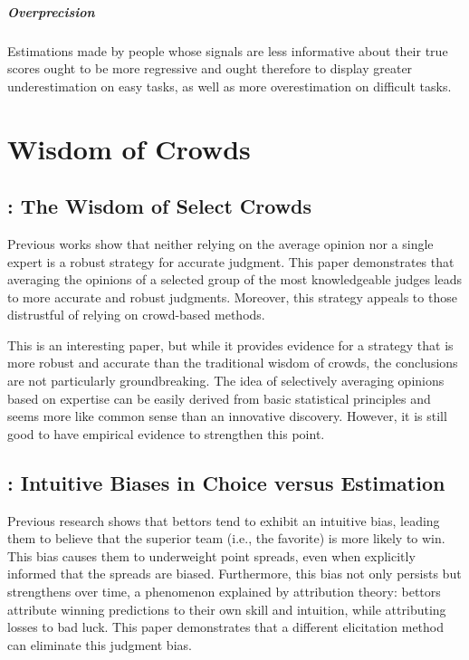 \documentclass[11pt]{elegantbook}
\begin{document}
\paragraph*{Overprecision}
Estimations made by people whose signals are less informative about their true scores ought to be more regressive and ought therefore to display greater underestimation on easy tasks, as well as more overestimation on difficult tasks.



\chapter{Wisdom of Crowds}
\section{\cite{mannes2014wisdom}: The Wisdom of Select Crowds}
Previous works show that neither relying on the average opinion nor a single expert is a robust strategy for accurate judgment. This paper demonstrates that averaging the opinions of a selected group of the most knowledgeable judges leads to more accurate and robust judgments. Moreover, this strategy appeals to those distrustful of relying on crowd-based methods.

This is an interesting paper, but while it provides evidence for a strategy that is more robust and accurate than the traditional wisdom of crowds, the conclusions are not particularly groundbreaking. The idea of selectively averaging opinions based on expertise can be easily derived from basic statistical principles and seems more like common sense than an innovative discovery. However, it is still good to have empirical evidence to strengthen this point.


\section{\cite{simmons2011intuitive}: Intuitive Biases in Choice versus Estimation}
Previous research shows that bettors tend to exhibit an intuitive bias, leading them to believe that the superior team (i.e., the favorite) is more likely to win. This bias causes them to underweight point spreads, even when explicitly informed that the spreads are biased. Furthermore, this bias not only persists but strengthens over time, a phenomenon explained by attribution theory: bettors attribute winning predictions to their own skill and intuition, while attributing losses to bad luck. This paper demonstrates that a different elicitation method can eliminate this judgment bias.
\end{document}
